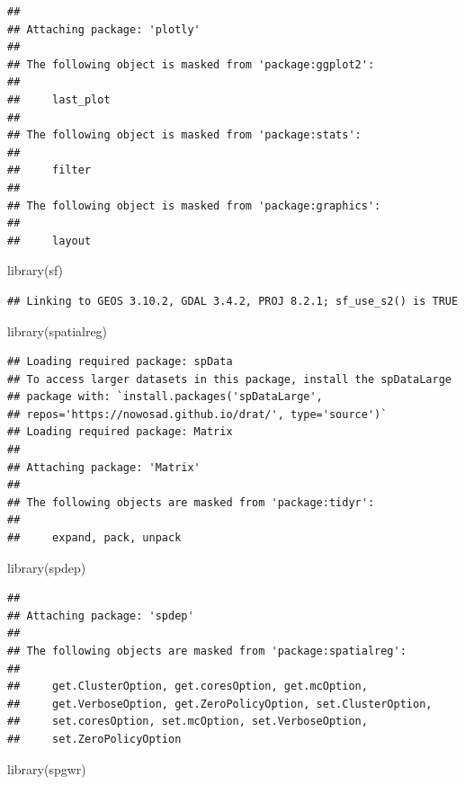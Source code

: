 \documentclass[
]{article}
\newenvironment{Shaded}{\begin{snugshade}}{\end{snugshade}}
\newcommand{\FunctionTok}[1]{\textcolor[rgb]{0.00,0.00,0.00}{#1}}
\newcommand{\NormalTok}[1]{#1}
\begin{document}
\begin{verbatim}
## 
## Attaching package: 'plotly'
## 
## The following object is masked from 'package:ggplot2':
## 
##     last_plot
## 
## The following object is masked from 'package:stats':
## 
##     filter
## 
## The following object is masked from 'package:graphics':
## 
##     layout
\end{verbatim}

\begin{Shaded}
\begin{Highlighting}[]
\FunctionTok{library}\NormalTok{(sf)}
\end{Highlighting}
\end{Shaded}

\begin{verbatim}
## Linking to GEOS 3.10.2, GDAL 3.4.2, PROJ 8.2.1; sf_use_s2() is TRUE
\end{verbatim}

\begin{Shaded}
\begin{Highlighting}[]
\FunctionTok{library}\NormalTok{(spatialreg)}
\end{Highlighting}
\end{Shaded}

\begin{verbatim}
## Loading required package: spData
## To access larger datasets in this package, install the spDataLarge
## package with: `install.packages('spDataLarge',
## repos='https://nowosad.github.io/drat/', type='source')`
## Loading required package: Matrix
## 
## Attaching package: 'Matrix'
## 
## The following objects are masked from 'package:tidyr':
## 
##     expand, pack, unpack
\end{verbatim}

\begin{Shaded}
\begin{Highlighting}[]
\FunctionTok{library}\NormalTok{(spdep)}
\end{Highlighting}
\end{Shaded}

\begin{verbatim}
## 
## Attaching package: 'spdep'
## 
## The following objects are masked from 'package:spatialreg':
## 
##     get.ClusterOption, get.coresOption, get.mcOption,
##     get.VerboseOption, get.ZeroPolicyOption, set.ClusterOption,
##     set.coresOption, set.mcOption, set.VerboseOption,
##     set.ZeroPolicyOption
\end{verbatim}

\begin{Shaded}
\begin{Highlighting}[]
\FunctionTok{library}\NormalTok{(spgwr)}
\end{Highlighting}
\end{Shaded}
\end{document}
